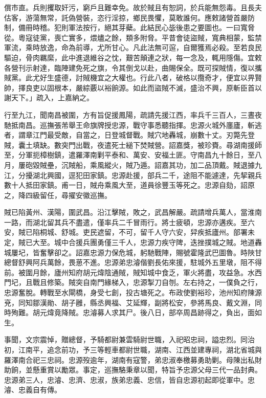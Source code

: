 \begin{pinyinscope}
償市直。兵則攫取奸污，窮戶且難幸免。故於賊且有恕詞，於兵能無怨毒。且長夫估客，游蕩無常，託偽營裝，恣行淫掠，鄉民畏懼，莫敢誰何。應敕諸營首嚴防制，備冊時稽。犯則軍法按行，絕其芽蘗。此結民心毖後患之要圖也。一曰寬脅從。粵寇徒黨，喪亡實多，煨燼之餘，類多附脅。平昔會徒盜賊，寬典相蒙，監禁軍流，乘時放逸，命為前導，尤所甘心。凡此法無可逭，自爾獲焉必殺。至若良民驅迫，骨肉羈縻，此中進退維谷之忱，艱苦顛連之狀，每一念及，輒用隱傷。宜敕各營刊示射達，臨陣建免死之旗，令其倒戈以赴，曲賜保全。既可探賊情，復以攜賊黨。此尤好生盛德，討賊機宜之大權也。行此八者，破格以攬奇才，便宜以畀賢帥，擇良吏以固根本，嚴綜覈以裕餉源。如此而盜賊不滅，盛治不興，原斬臣首以謝天下。」疏入，上嘉納之。

行至九江，聞南昌被圍，方有旨促援鳳陽，疏請先援江西，率兵千三百人，三晝夜馳抵南昌。巡撫張芾舉王命旗牌授忠源，戰守事悉聽指揮。忠源火城外廛廬，斬逃者，謂章江門最受敵，自當之，日登城督戰。賊穴地轟城，崩數十丈。刃斃先登賊，囊土填缺。數突門出戰，夜遣死士縋下焚賊營。詔嘉獎，被珍賚。尋湖南援師至，分軍扼樟樹鎮，遣羅澤南剿平泰和、萬安、安福土匪。守南昌九十餘日，至八月，屢砲毀賊壘，沉賊船，乘風縱火，賊乃遁。詔嘉其功，加二品頂戴。賊退據九江，分擾湖北興國，逕犯田家鎮。忠源赴援，部兵二千，途阻不能遽達，先挈親兵數十人抵田家鎮。甫一日，賊舟乘風大至，道員徐豐玉等死之。忠源自劾，詔原之，降四級留任，尋擢安徽巡撫。

賊已陷黃州、漢陽，圍武昌。沿江擊賊，敗之，武昌解嚴。疏請增兵萬人，當淮南一路，而湖北留其兵不盡遣，僅率兵二千冒雨行。將士疲頓，忠源亦遘疾。至六安，賊已陷桐城、舒城。吏民遮留，不可，留千人守六安，舁疾抵廬州。部署未定，賊已大至。城中合援兵團勇僅三千人，忠源力疾守陴，迭挫撲城之賊。地道轟城屢圮，皆奮擊卻之。詔嘉忠源力保危城，躬馳戰陣，賜號霍隆武巴圖魯。時陜甘總督舒興阿兵萬餘，畏葸不進。忠源弟忠濬偕劉長佑來援，駐城外五里墩，阻不得前。被圍月餘，廬州知府胡元煒陰通賊，賊知城中食乏，軍火將盡，攻益急。水西門圮，且戰且修築。賊突自南門緣梯入，忠源掣刀自刎。左右持之，一僕負之行，忠源奮脫。轉戰至水閘橋，身受七創，投古塘死之。布政使劉裕珍，池州知府陳源兗，同知鄒漢勛、胡子雝，縣丞興福、艾延輝，副將松安，參將馬良、戴文淵，同時殉難。胡元煒竟降賊。忠濬募人求其尸。後八日，部卒周昌跡得之，負出，面如生。

事聞，文宗震悼，贈總督，予騎都尉兼雲騎尉世職，入祀昭忠祠，謚忠烈。同治初，江南平，追念前功，予三等輕車都尉世職，湖南、江西並建專祠，湖北省城與羅澤南合祀三忠祠。忠源歿逾年，湖南有寇警，弟忠淑奉檄募勇助剿。母陳出私財助餉，並懸重賞以勵眾。事定，巡撫駱秉章以聞，特旨予忠源父母三代一品封典。忠源弟三人，忠濬、忠濟、忠淑，族弟忠義、忠信，皆自忠源初起即從軍中。忠濬、忠義自有傳。


\end{pinyinscope}
